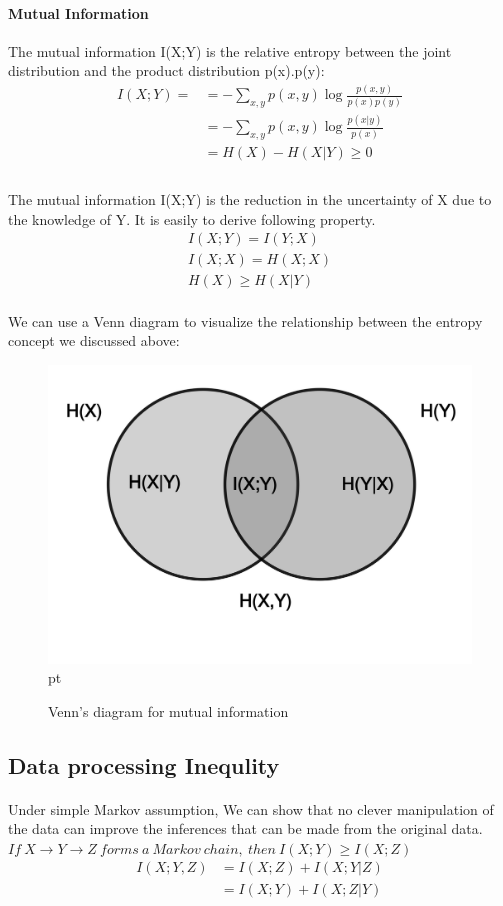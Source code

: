 \documentclass[a4paper, 11pt]{article} %
\begin{document}
\paragraph{Mutual Information}
The mutual information I(X;Y) is the relative entropy between the joint distribution and the product distribution p(x).p(y):
\begin{align*} 
I(X;Y)=&= -\sum_{x,y}p(x,y)\log \frac{p(x,y)}{p(x)p(y)}\\
       &=-\sum_{x,y}p(x,y)\log \frac{p(x|y)}{p(x)}\\
       &=H(X)-H(X|Y)\geq 0\\
 \end{align*}
\paragraph{}
The mutual information I(X;Y) is the reduction in the uncertainty of X due to the knowledge of Y. It is easily to derive following property.
\begin{align*} 
I(X;Y)=I(Y;X)\\
I(X;X)  =H(X;X)\\
H(X)\geq H(X|Y)
 \end{align*}

 
\paragraph{}
We can use a Venn diagram to visualize the relationship between the entropy concept we discussed above:
\begin{figure}[ht]
\begin{center}
\includegraphics[width=2 in]{venn.jpg}
 pt
\caption{Venn's diagram for mutual information}
\end{center}
\end{figure}
\subsection*{Data processing Inequlity}

\paragraph{}
Under simple Markov assumption, We can show that no clever manipulation of the data can improve the inferences that can be made from the original data.\\
$If ~X\rightarrow Y\rightarrow Z ~forms ~a ~Markov ~chain, ~then ~I(X;Y)\geq I(X;Z)$
\begin{align} 
I(X;Y,Z)&=I(X;Z)+I(X;Y|Z)\\
       &=I(X;Y)+I(X;Z|Y)     
 \end{align}
\end{document}
